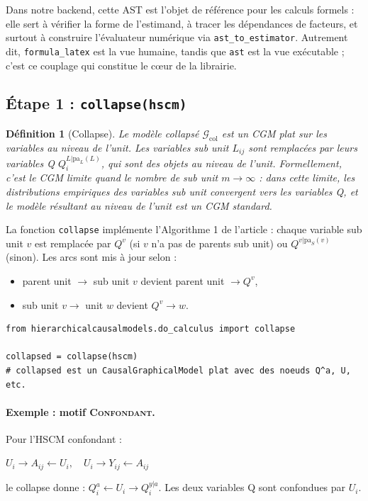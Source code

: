 \documentclass[11pt,a4paper]{article}
\newcommand{\col}{\mathrm{col}}
\newtheorem{definition}{Définition}
\begin{document}
Dans notre backend, cette AST est l'objet de référence pour les calculs formels : elle sert à vérifier la forme de l'estimand, à tracer les dépendances de facteurs, et surtout à construire l'évaluateur numérique via \texttt{ast\_to\_estimator}. Autrement dit, \texttt{formula\_latex} est la vue humaine, tandis que \texttt{ast} est la vue exécutable ; c'est ce couplage qui constitue le cœur de la librairie.

\subsection{Étape 1 : \texttt{collapse(hscm)}}

\begin{definition}[Collapse]
Le modèle collapsé $\mathcal{G}_\col$ est un CGM plat sur les variables au niveau de l'unit.
Les variables sub unit $L_{ij}$ sont remplacées par leurs variables Q $Q^{L|\text{pa}_L(L)}_i$, qui sont des objets au niveau de l'unit.
Formellement, c'est le CGM limite quand le nombre de sub unit $m \to \infty$ : dans cette limite, les distributions empiriques des variables sub unit convergent vers les variables Q, et le modèle résultant au niveau de l'unit est un CGM standard.
\end{definition}

La fonction \texttt{collapse} implémente l'Algorithme 1 de l'article : chaque variable sub unit $v$ est remplacée par $Q^v$ (si $v$ n'a pas de parents sub unit) ou $Q^{v|\text{pa}_S(v)}$ (sinon). Les arcs sont mis à jour selon :
\begin{itemize}
  \item parent unit $\to$ sub unit $v$ devient parent unit $\to Q^v$,
  \item sub unit $v \to$ unit $w$ devient $Q^v \to w$.
\end{itemize}

\begin{lstlisting}[caption={Utilisation de \texttt{collapse}}]
from hierarchicalcausalmodels.do_calculus import collapse

collapsed = collapse(hscm)
# collapsed est un CausalGraphicalModel plat avec des noeuds Q^a, U, etc.
\end{lstlisting}

\paragraph{Exemple : motif \textsc{Confondant}.}
Pour l'HSCM confondant :
\begin{center}
$U_i \to A_{ij} \leftarrow U_i,\quad U_i \to Y_{ij} \leftarrow A_{ij}$
\end{center}
le collapse donne : $Q^a_i \leftarrow U_i \rightarrow Q^{y|a}_i$. Les deux variables Q sont confondues par $U_i$.
\end{document}
